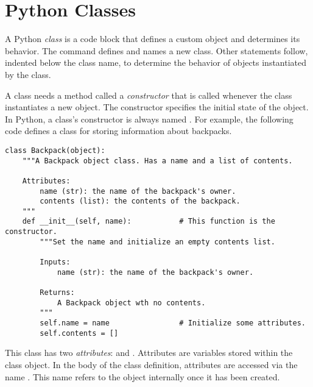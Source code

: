 \label{lab:OOP}

\section*{Python Classes} %

A Python \emph{class} is a code block that defines a custom object and determines its behavior.
The  command defines and names a new class.
Other statements follow, indented below the class name, to determine the behavior of objects instantiated by the class.

A class needs a method called a \emph{constructor} that is called whenever the class instantiates a new object.
The constructor specifies the initial state of the object.
In Python, a class's constructor is always named .
For example, the following code defines a class for storing information about backpacks.

\begin{lstlisting}
class Backpack(object):
    """A Backpack object class. Has a name and a list of contents.
    
    Attributes:
        name (str): the name of the backpack's owner.
        contents (list): the contents of the backpack.
    """
    def __init__(self, name):           # This function is the constructor.
        """Set the name and initialize an empty contents list.
        
        Inputs:
            name (str): the name of the backpack's owner.
        
        Returns:
            A Backpack object wth no contents.
        """
        self.name = name                # Initialize some attributes.
        self.contents = []
\end{lstlisting}

This  class has two \emph{attributes}:  and .
Attributes are variables stored within the class object.
In the body of the class definition, attributes are accessed via the name .
This name refers to the object internally once it has been created.

